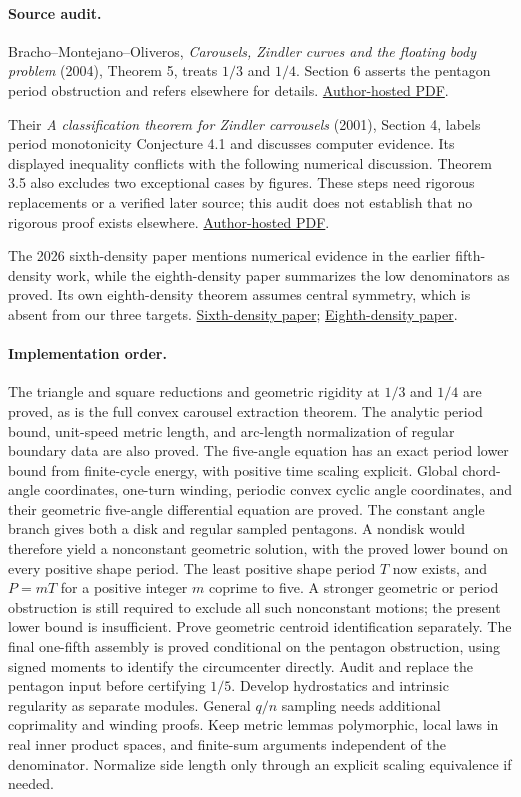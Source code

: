 \paragraph{Source audit.}
Bracho--Montejano--Oliveros, \emph{Carousels, Zindler curves and the floating
body problem} (2004), Theorem 5, treats $1/3$ and $1/4$. Section 6 asserts
the pentagon period obstruction and refers elsewhere for details.
\href{https://www.matem.unam.mx/~luis/pdfs/volantin1.pdf}{Author-hosted PDF}.

Their \emph{A classification theorem for Zindler carrousels} (2001),
Section 4, labels period monotonicity Conjecture 4.1 and discusses computer
evidence. Its displayed inequality conflicts with the following numerical
discussion. Theorem 3.5 also excludes two exceptional cases by figures.
These steps need rigorous replacements or a verified later source; this
audit does not establish that no rigorous proof exists elsewhere.
\href{https://www.matem.unam.mx/~luis/pdfs/volantin2.pdf}{Author-hosted PDF}.

The 2026 sixth-density paper mentions numerical evidence in the earlier
fifth-density work, while the eighth-density paper summarizes the low
denominators as proved. Its own eighth-density theorem assumes central
symmetry, which is absent from our three targets.
\href{https://arxiv.org/abs/2604.10330}{Sixth-density paper};
\href{https://arxiv.org/abs/2607.08338}{Eighth-density paper}.

\paragraph{Implementation order.}
The triangle and square reductions and geometric rigidity at $1/3$ and $1/4$
are proved, as is the full convex carousel extraction theorem.
The analytic period bound, unit-speed metric length, and arc-length
normalization of regular boundary data are also proved.
The five-angle equation has an exact period lower bound from finite-cycle
energy, with positive time scaling explicit. Global chord-angle coordinates,
one-turn winding, periodic convex cyclic angle coordinates, and their
geometric five-angle differential equation are proved. The constant angle
branch gives both a disk and regular sampled pentagons. A nondisk would
therefore yield a nonconstant geometric solution, with the proved lower
bound on every positive shape period. The least positive shape period $T$
now exists, and $P=mT$ for a positive integer $m$ coprime to five.
A stronger geometric or period obstruction is still required to exclude
all such nonconstant motions; the present lower bound is insufficient.
Prove geometric centroid identification separately.
The final one-fifth assembly is proved conditional on the pentagon obstruction,
using signed moments to identify the circumcenter directly.
Audit and replace the pentagon input
before certifying $1/5$. Develop hydrostatics and intrinsic regularity as
separate modules. General $q/n$ sampling needs additional coprimality and
winding proofs. Keep metric lemmas polymorphic, local laws in real inner
product spaces, and finite-sum arguments independent of the denominator.
Normalize side length only through an explicit scaling equivalence if needed.
